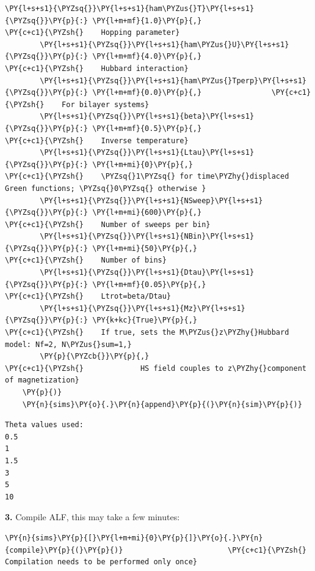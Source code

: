 \begin{tcolorbox}[breakable, size=fbox, boxrule=1pt, pad at break*=1mm,colback=cellbackground, colframe=cellborder]
\begin{Verbatim}[commandchars=\\\{\}]
        \PY{l+s+s1}{\PYZsq{}}\PY{l+s+s1}{ham\PYZus{}T}\PY{l+s+s1}{\PYZsq{}}\PY{p}{:} \PY{l+m+mf}{1.0}\PY{p}{,}                    \PY{c+c1}{\PYZsh{}    Hopping parameter}
        \PY{l+s+s1}{\PYZsq{}}\PY{l+s+s1}{ham\PYZus{}U}\PY{l+s+s1}{\PYZsq{}}\PY{p}{:} \PY{l+m+mf}{4.0}\PY{p}{,}                    \PY{c+c1}{\PYZsh{}    Hubbard interaction}
        \PY{l+s+s1}{\PYZsq{}}\PY{l+s+s1}{ham\PYZus{}Tperp}\PY{l+s+s1}{\PYZsq{}}\PY{p}{:} \PY{l+m+mf}{0.0}\PY{p}{,}                \PY{c+c1}{\PYZsh{}    For bilayer systems}
        \PY{l+s+s1}{\PYZsq{}}\PY{l+s+s1}{beta}\PY{l+s+s1}{\PYZsq{}}\PY{p}{:} \PY{l+m+mf}{0.5}\PY{p}{,}                     \PY{c+c1}{\PYZsh{}    Inverse temperature}
        \PY{l+s+s1}{\PYZsq{}}\PY{l+s+s1}{Ltau}\PY{l+s+s1}{\PYZsq{}}\PY{p}{:} \PY{l+m+mi}{0}\PY{p}{,}                       \PY{c+c1}{\PYZsh{}    \PYZsq{}1\PYZsq{} for time\PYZhy{}displaced Green functions; \PYZsq{}0\PYZsq{} otherwise }
        \PY{l+s+s1}{\PYZsq{}}\PY{l+s+s1}{NSweep}\PY{l+s+s1}{\PYZsq{}}\PY{p}{:} \PY{l+m+mi}{600}\PY{p}{,}                   \PY{c+c1}{\PYZsh{}    Number of sweeps per bin}
        \PY{l+s+s1}{\PYZsq{}}\PY{l+s+s1}{NBin}\PY{l+s+s1}{\PYZsq{}}\PY{p}{:} \PY{l+m+mi}{50}\PY{p}{,}                      \PY{c+c1}{\PYZsh{}    Number of bins}
        \PY{l+s+s1}{\PYZsq{}}\PY{l+s+s1}{Dtau}\PY{l+s+s1}{\PYZsq{}}\PY{p}{:} \PY{l+m+mf}{0.05}\PY{p}{,}                    \PY{c+c1}{\PYZsh{}    Ltrot=beta/Dtau}
        \PY{l+s+s1}{\PYZsq{}}\PY{l+s+s1}{Mz}\PY{l+s+s1}{\PYZsq{}}\PY{p}{:} \PY{k+kc}{True}\PY{p}{,}                      \PY{c+c1}{\PYZsh{}    If true, sets the M\PYZus{}z\PYZhy{}Hubbard model: Nf=2, N\PYZus{}sum=1,}
        \PY{p}{\PYZcb{}}\PY{p}{,}                               \PY{c+c1}{\PYZsh{}             HS field couples to z\PYZhy{}component of magnetization}
    \PY{p}{)}
    \PY{n}{sims}\PY{o}{.}\PY{n}{append}\PY{p}{(}\PY{n}{sim}\PY{p}{)}
\end{Verbatim}
\end{tcolorbox}

    \begin{Verbatim}[commandchars=\\\{\}]
Theta values used:
0.5
1
1.5
3
5
10
    \end{Verbatim}

    \textbf{3.} Compile ALF, this may take a few minutes:

    \begin{tcolorbox}[breakable, size=fbox, boxrule=1pt, pad at break*=1mm,colback=cellbackground, colframe=cellborder]
\begin{Verbatim}[commandchars=\\\{\}]
\PY{n}{sims}\PY{p}{[}\PY{l+m+mi}{0}\PY{p}{]}\PY{o}{.}\PY{n}{compile}\PY{p}{(}\PY{p}{)}                        \PY{c+c1}{\PYZsh{} Compilation needs to be performed only once}
\end{Verbatim}
\end{tcolorbox}

